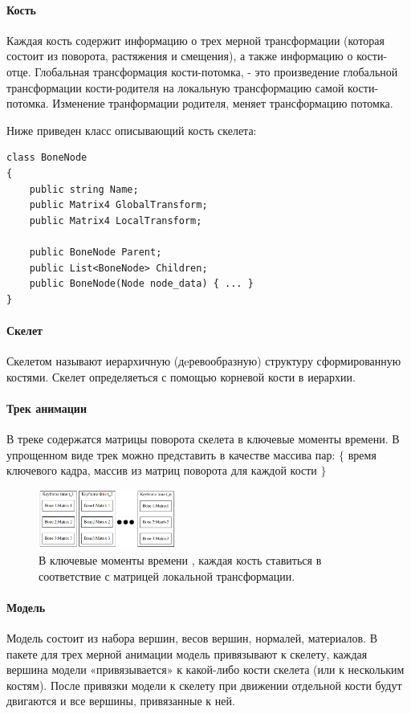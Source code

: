 \paragraph{Кость}
Каждая кость содержит информацию о трех мерной трансформации (которая состоит из поворота, растяжения и смещения), а также информацию о кости-отце. Глобальная трансформация кости-потомка, - это произведение глобальной трансформации кости-родителя на локальную трансформацию самой кости-потомка. Изменение транформации родителя, меняет трансформацию потомка.

Ниже приведен класс описывающий кость скелета:
\begin{verbatim}
class BoneNode
{
    public string Name;
    public Matrix4 GlobalTransform;
    public Matrix4 LocalTransform;

    public BoneNode Parent;
    public List<BoneNode> Children;
    public BoneNode(Node node_data) { ... }
}
\end{verbatim}

\paragraph{Скелет}
Скелетом называют иерархичную (дeревообразную) структуру сформированную костями. Скелет определяеться с помощью корневой кости в иерархии.


\paragraph{Трек анимации}
В треке содержатся матрицы поворота скелета в ключевые моменты времени.
В упрощенном виде трек можно представить в качестве  массива пар: 
$\lbrace$ время ключевого кадра, массив из матриц поворота для каждой кости $\rbrace$

\begin{figure}[h!]
    \centering
    \includegraphics[width=0.4\textwidth]{anim_track.png}
    \caption{\small{В ключевые моменты времени , каждая кость ставиться в соответствие с матрицей локальной трансформации.}}
    
\end{figure}


\paragraph{Модель}
Модель состоит из набора вершин, весов вершин, нормалей, материалов. В пакете для трех мерной анимации модель привязывают к скелету, каждая вершина модели «привязывается» к какой-либо кости скелета (или к нескольким костям). После привязки модели к скелету при движении отдельной кости будут двигаются и все вершины, привязанные к ней.

